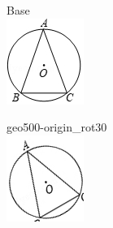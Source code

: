 \documentclass[12pt]{article}
\begin{document}
\begin{center}
\begin{minipage}{0.32\textwidth}\centering
Base\\
\includegraphics[width=0.95\linewidth]{out_rommath_origin/items/geo500-origin/assets/figure.png}
\end{minipage}
\hfill\begin{minipage}{0.32\textwidth}\centering
geo500-origin\_rot30\\
\includegraphics[width=0.95\linewidth]{out_rommath_origin/items/geo500-origin/assets/figure_rot30.png}

\end{minipage}
\end{center}
\end{document}

